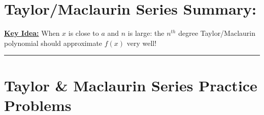 \lectTitle{\vspace*{-.6in}\myTitle}{\vspace*{.1in}\mySubTitle \vspace*{-.4in}}






\setlength{\columnseprule}{.4pt}
\setlength{\columnsep}{3em}

\section*{Taylor/Maclaurin Series Summary:}
\textbf{\underline{\large Key Idea:}}
When \(x\) is close to \(a\) and \(n\) is large: the \(n^{th}\) degree Taylor/Maclaurin polynomial should approximate \(f(x)\) very well!\\

\hrule
\vspace*{.2in}





\vspace*{-1in}



%
%
%
%
%

\pagebreak

\section*{Taylor \& Maclaurin Series Practice Problems}

